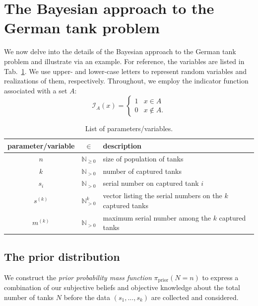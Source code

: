 \documentclass[11pt, oneside]{article}
\newcommand{\data}{$(s_1, ..., s_k)$\xspace}
\begin{document}

\section{The Bayesian approach to the German tank problem}
We now delve into the details of the Bayesian approach to the German tank problem and illustrate via an example. 
For reference, the variables are listed in Tab.~\ref{tab:params}. 
We use upper- and lower-case letters to represent random variables and realizations of them, respectively. 
Throughout, we employ the indicator function associated with a set $A$:
\begin{equation}
\mathcal{I}_{A}(x) = \begin{cases} 1 & x \in A \\ 0 & x \notin A . \end{cases} 
\end{equation}

\begin{table}[h!]
	\centering
	\caption{List of parameters/variables.} \label{tab:params}
	\begin{tabular}{c c l}
		\toprule
		parameter/variable & $\in$ & description \\
		\midrule
		$n$ & $\mathbb{N}_{\geq 0}$ & size of population of tanks \\
		$k$ & $\mathbb{N}_{>0}$ &  number of captured tanks \\
		$s_i$ & $\mathbb{N}_{>0}$ &  serial number on captured tank $i$ \\
		$s^{(k)}$ & $\mathbb{N}_{>0}^k$ & vector listing the serial numbers on the $k$ captured tanks \\
		$m^{(k)}$ & $\mathbb{N}_{>0}$ &  maximum serial number among the $k$ captured tanks \\
		\bottomrule
	\end{tabular}
\end{table}

\subsection{The prior distribution}
We construct the \emph{prior probability mass function} $\pi_{\text{prior}}(N=n)$ to express a combination of our subjective beliefs and objective knowledge about the total number of tanks $N$ before the data \data are collected and considered. 
\end{document}
